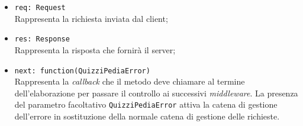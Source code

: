 \begin{itemize}
\begin{itemize}
\begin{itemize}
		  \item
			\texttt{req: Request} \\
			Rappresenta la richiesta inviata dal client;
		  \item
			\texttt{res: Response} \\
			Rappresenta la risposta che fornirà il server;
		  \item
		    \texttt{next: function(QuizziPediaError)} \\
			Rappresenta la \textit{callback} che il metodo deve chiamare al termine dell'elaborazione per passare il controllo ai successivi \textit{middleware}. La presenza del parametro facoltativo \texttt{QuizziPediaError} attiva la catena di gestione dell'errore in sostituzione della normale catena di gestione delle richieste.
		 \end{itemize}
	\end{itemize}	 
\end{itemize}	
